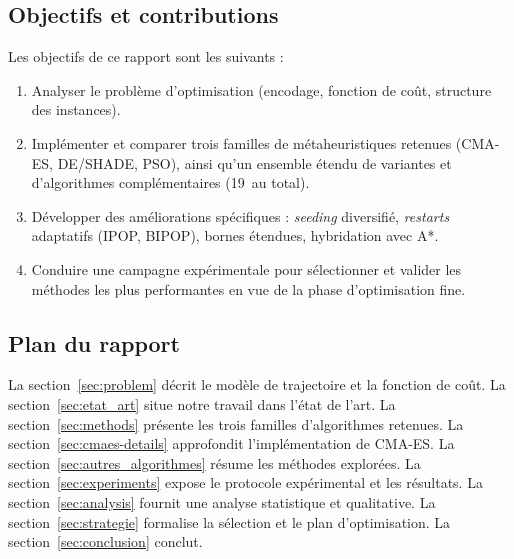 \subsection{Objectifs et contributions}

Les objectifs de ce rapport sont les suivants :
\begin{enumerate}[nosep]
  \item Analyser le problème d'optimisation (encodage, fonction de coût,
        structure des instances).
  \item Implémenter et comparer trois familles de métaheuristiques retenues
        (CMA-ES, DE/SHADE, PSO), ainsi qu'un ensemble étendu de variantes et
        d'algorithmes complémentaires (19~au total).
  \item Développer des améliorations spécifiques : \textit{seeding} diversifié,
        \textit{restarts} adaptatifs (IPOP, BIPOP), bornes étendues,
        hybridation avec A*.
  \item Conduire une campagne expérimentale pour sélectionner et valider les
        méthodes les plus performantes en vue de la phase d'optimisation fine.
\end{enumerate}

\subsection{Plan du rapport}

La section~\ref{sec:problem} décrit le modèle de trajectoire et la fonction de
coût.  La section~\ref{sec:etat_art} situe notre travail dans l'état de l'art.
La section~\ref{sec:methods} présente les trois familles d'algorithmes retenues.
La section~\ref{sec:cmaes-details} approfondit l'implémentation de CMA-ES.
La section~\ref{sec:autres_algorithmes} résume les méthodes explorées.
La section~\ref{sec:experiments} expose le protocole expérimental et les
résultats.  La section~\ref{sec:analysis} fournit une analyse statistique et
qualitative.  La section~\ref{sec:strategie} formalise la sélection et le plan
d'optimisation.  La section~\ref{sec:conclusion} conclut.
